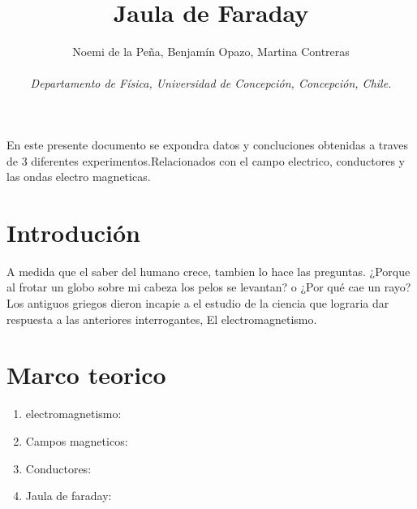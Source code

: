 \documentclass[a4paper,12pt]{article}
\title{Jaula de Faraday}
\author{Noemi de la Peña, Benjamín Opazo, Martina Contreras \\ \\
 \textit{ Departamento de Física, Universidad de Concepción, Concepción, Chile. }}
\date{}
\begin{document}
\maketitle 




En este presente documento se expondra datos y concluciones 
obtenidas a traves de 3 diferentes experimentos.Relacionados con el campo electrico,
conductores y las ondas electro magneticas.



\section*{Introdución}
    A medida que el saber del humano crece, tambien lo hace las preguntas.
    ¿Porque al frotar un globo sobre mi cabeza los pelos se levantan? o 
    ¿Por qué cae un rayo?
    Los antiguos griegos dieron incapie a el estudio de la ciencia que 
    lograria dar respuesta a las anteriores interrogantes, El electromagnetismo.
\section*{Marco teorico}
\begin{enumerate}
    \item electromagnetismo:
    \item Campos magneticos:
    \item Conductores:
    \item Jaula de faraday:
\end{enumerate}

   






\end{document}
